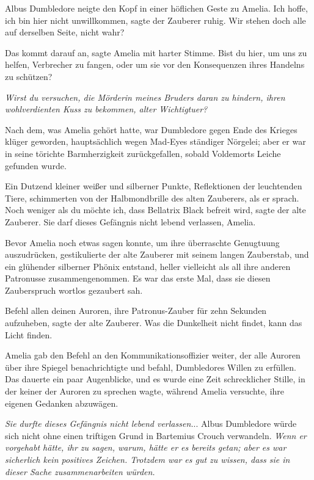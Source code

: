 Albus Dumbledore neigte den Kopf in einer höflichen Geste zu Amelia. \glqq{}Ich
hoffe, ich bin hier nicht unwillkommen\grqq{}, sagte der Zauberer ruhig. \glqq{}
Wir stehen doch alle auf derselben Seite, nicht wahr?\grqq{}

\glqq{}Das kommt darauf an\grqq{}, sagte Amelia mit harter Stimme. \glqq{}Bist du
hier, um uns zu helfen, Verbrecher zu fangen, oder um sie vor den Konsequenzen
ihres Handelns zu schützen?\grqq{}

\emph{Wirst du versuchen, die Mörderin meines Bruders daran zu hindern, ihren
wohlverdienten Kuss zu bekommen, alter Wichtigtuer?}

Nach dem, was Amelia gehört hatte, war Dumbledore gegen Ende des Krieges klüger
geworden, hauptsächlich wegen Mad-Eyes ständiger Nörgelei; aber er war in seine
törichte Barmherzigkeit zurückgefallen, sobald Voldemorts Leiche gefunden wurde.

Ein Dutzend kleiner weißer und silberner Punkte, Reflektionen der leuchtenden
Tiere, schimmerten von der Halbmondbrille des alten Zauberers, als er sprach.
\glqq{}Noch weniger als du möchte ich, dass Bellatrix Black befreit wird\grqq{},
sagte der alte Zauberer. \glqq{}Sie darf dieses Gefängnis nicht lebend verlassen,
Amelia.\grqq{}

Bevor Amelia noch etwas sagen konnte, um ihre überraschte Genugtuung
auszudrücken, gestikulierte der alte Zauberer mit seinem langen Zauberstab, und
ein glühender silberner Phönix entstand, heller vielleicht als all ihre anderen
Patronusse zusammengenommen. Es war das erste Mal, dass sie diesen Zauberspruch
wortlos gezaubert sah.

\glqq{}Befehl allen deinen Auroren, ihre Patronus-Zauber für zehn Sekunden
aufzuheben\grqq{}, sagte der alte Zauberer. \glqq{}Was die Dunkelheit nicht
findet, kann das Licht finden.\grqq{}

Amelia gab den Befehl an den Kommunikationsoffizier weiter, der alle Auroren
über ihre Spiegel benachrichtigte und befahl, Dumbledores Willen zu erfüllen.
Das dauerte ein paar Augenblicke, und es wurde eine Zeit schrecklicher Stille,
in der keiner der Auroren zu sprechen wagte, während Amelia versuchte, ihre
eigenen Gedanken abzuwägen.

\emph{Sie durfte dieses Gefängnis nicht lebend verlassen.}.. Albus Dumbledore
würde sich nicht ohne einen triftigen Grund in Bartemius Crouch verwandeln.
\emph{Wenn er vorgehabt hätte, ihr zu sagen, warum, hätte er es bereits getan;
aber es war sicherlich kein positives Zeichen. Trotzdem war es gut zu wissen,
dass sie in dieser Sache zusammenarbeiten würden.}


